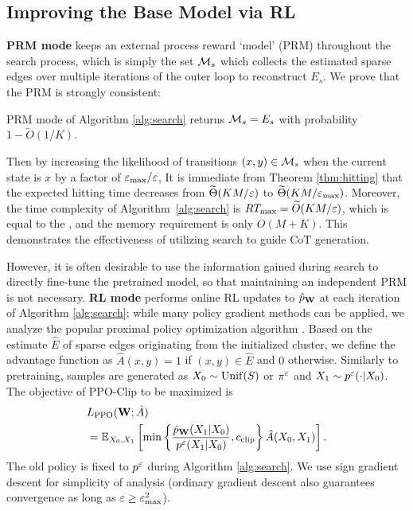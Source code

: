 \subsection{Improving the Base Model via RL}


\textbf{PRM mode} keeps an external process reward `model' (PRM) throughout the search process, which is simply the set $\mathcal{M}_s$ which collects the estimated sparse edges over multiple iterations of the outer loop to reconstruct $E_s$. We prove that the PRM is strongly consistent:

\begin{prop}\label{thm:consistent}
PRM mode of Algorithm \ref{alg:search} returns $\mathcal{M}_s = E_s$ with probability $1-\widetilde{O}(1/K)$.
\end{prop}

Then by increasing the likelihood of transitions $(x,y)\in\mathcal{M}_s$ when the current state is $x$ by a factor of $\varepsilon_{\max}/\varepsilon$,  It is immediate from Theorem \ref{thm:hitting} that the expected hitting time decreases from $\widetilde{\Theta}(KM/\varepsilon)$ to $\widetilde{\Theta}(KM/\varepsilon_{\max})$. Moreover, the time complexity of Algorithm~\ref{alg:search} is $RT_{\max}=\widetilde{O}(KM/\varepsilon)$, which is equal to the , and the memory requirement is only $O(M+K)$. This demonstrates the effectiveness of utilizing search to guide CoT generation.


However, it is often desirable to use the information gained during search to directly fine-tune the pretrained model, so that maintaining an independent PRM is not necessary. \textbf{RL mode} performs online RL updates to $\hat{p}_{\mathbf{W}}$ at each iteration of Algorithm \ref{alg:search}; while many policy gradient methods can be applied, we analyze the popular proximal policy optimization algorithm \citep[PPO-Clip,][]{Schulman17}. Based on the estimate $\hat{E}$ of sparse edges originating from the initialized cluster, we define the advantage function as $\hat{A}(x,y)=1$ if $(x,y)\in\hat{E}$ and $0$ otherwise. Similarly to pretraining, samples are generated as $X_0\sim\operatorname{Unif}(S)$ or $\pi^\varepsilon$ and $X_1\sim p^\varepsilon(\cdot|X_0)$. The objective of PPO-Clip to be maximized is
\citep{spinningup_ppo}
\begin{align*}
&L_{\operatorname{PPO}}(\mathbf{W};\hat{A})\\
&= \mathbb{E}_{X_0,X_1}\left[\min\left\{\frac{\hat{p}_{\mathbf{W}}(X_1|X_0)}{p^\varepsilon(X_1|X_0)}, c_{\operatorname{clip}}\right\} \hat{A}(X_0,X_1)\right].
\end{align*}
The old policy is fixed to $p^\varepsilon$ during Algorithm \ref{alg:search}. We use sign gradient descent for simplicity of analysis (ordinary gradient descent also guarantees convergence as long as $\varepsilon\ge\varepsilon_{\max}^2$).

